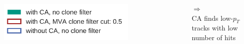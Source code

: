 \documentclass[18pt, aspectratio=169]{beamer}
\begin{document}
\begin{frame}
\begin{columns}
\begin{column}{.5\textwidth}
    \end{column}
  \end{columns}
  \begin{columns}
    \begin{column}{.5\textwidth}
\includegraphics[width=0.7\textwidth]{figures/legend_rejected_vs_other_track_distributions.pdf}
    \end{column}
    \begin{column}{.5\textwidth}
      $\Rightarrow$\\CA finds low-$p_T$ tracks with low number of hits      
    \end{column}
  \end{columns}
\end{frame}
\end{document}
